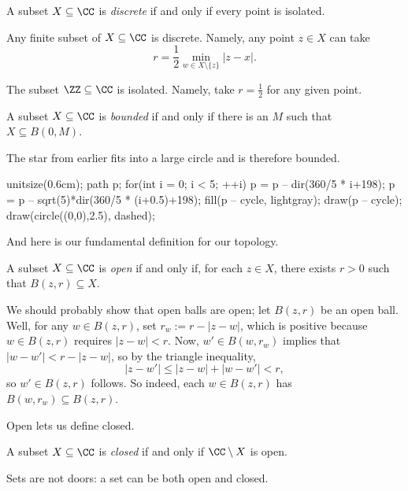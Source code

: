 \begin{definition}[Discrete]
	A subset $X\subseteq\CC$ is \textit{discrete} if and only if every point is isolated.
\end{definition}
\begin{example}
	Any finite subset of $X\subseteq\CC$ is discrete. Namely, any point $z\in X$ can take
	\[r=\frac12\min_{w\in X\setminus\{z\}}|z-x|.\]
\end{example}
\begin{example}
	The subset $\ZZ\subseteq\CC$ is isolated. Namely, take $r=\frac12$ for any given point.
\end{example}
\begin{definition}[Bounded]
	A subset $X\subseteq\CC$ is \textit{bounded} if and only if there is an $M$ such that $X\subseteq B(0,M)$.
\end{definition}
\begin{example}
	The star from earlier fits into a large circle and is therefore bounded.
	\begin{center}
		\begin{asy}
			unitsize(0.6cm);
			path p;
			for(int i = 0; i < 5; ++i)
			{
				p = p -- dir(360/5 * i+198);
				p = p -- sqrt(5)*dir(360/5 * (i+0.5)+198);
			}
			fill(p -- cycle, lightgray);
			draw(p -- cycle);
			draw(circle((0,0),2.5), dashed);
		\end{asy}
	\end{center}
\end{example}
And here is our fundamental definition for our topology.
\begin{defi}[Open]
	A subset $X\subseteq\CC$ is \textit{open} if and only if, for each $z\in X$, there exists $r>0$ such that $B(z,r)\subseteq X$.
\end{defi}
\begin{remark}[Nir]
	We should probably show that open balls are open; let $B(z,r)$ be an open ball. Well, for any $w\in B(z,r)$, set $r_w:=r-|z-w|$, which is positive because $w\in B(z,r)$ requires $|z-w|<r$. Now, $w'\in B(w,r_w)$ implies that $|w-w'|<r-|z-w|$, so by the triangle inequality,
	\[|z-w'|\le|z-w|+|w-w'|<r,\]
	so $w'\in B(z,r)$ follows. So indeed, each $w\in B(z,r)$ has $B(w,r_w)\subseteq B(z,r)$.
\end{remark}
Open lets us define closed.
\begin{definition}[Closed]
	A subset $X\subseteq\CC$ is \textit{closed} if and only if $\CC\setminus X$ is open.
\end{definition}
\begin{warn}
	Sets are not doors: a set can be both open and closed.
\end{warn}

